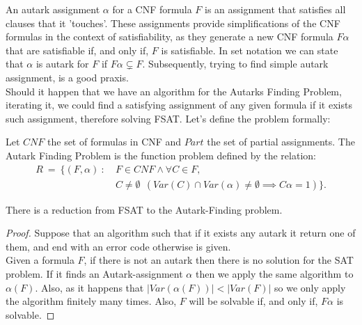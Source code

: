 An autark assignment $\alpha$  for a CNF formula $F$ is an assignment that satisfies all clauses that it 'touches'. These assignments provide simplifications of the CNF formulas in the context of satisfiability, as they generate a new CNF formula $F\alpha$ that are satisfiable if, and only if,  $F$ is satisfiable. In set notation we can state that $\alpha$ is autark for $F$ if $F\alpha \subsetneq F$. Subsequently, trying to find simple autark assignment, is a good praxis.\\


Should it happen that we have an algorithm for the Autarks Finding Problem, iterating it, we could find a satisfying assignment of any given formula if it exists such assignment, therefore solving FSAT.  Let's define the problem formally:

\begin{definition}
  Let $CNF$ the set of formulas in CNF and $Part$ the set of partial assignments. The Autark Finding Problem is the function problem defined by the relation:\\

\begin{equation}
\begin{split}
    R\ =\ \{(F,\alpha)\ :\ & F \in CNF\wedge \forall C \in F,\\ & C\ne \emptyset\ \ ( Var(C)\cap Var(\alpha)\ne\emptyset \implies C\alpha=1 )\}.
\end{split}
\end{equation}
  
\end{definition}

\begin{theorem}\label{the:autark}
  There is a reduction from FSAT to the Autark-Finding problem.
\end{theorem}
\begin{proof} Suppose that an algorithm such that if it exists any autark it return one of them, and end with an error code otherwise is given.  \\

    Given a formula $F$, if there is not an autark then there is no solution for the SAT problem. If it finds an Autark-assignment $\alpha$ then we apply the same algorithm to $\alpha(F)$. Also, as it happens that $|Var(\alpha(F))|<|Var(F)|$ so we only apply the algorithm finitely many times. Also, $F$ will be solvable if, and only if, $F\alpha$ is solvable.
\end{proof}


